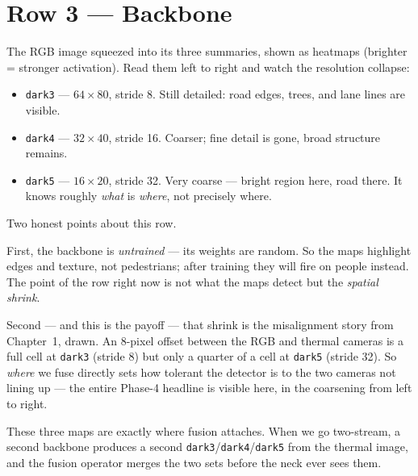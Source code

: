 \documentclass[../main.tex]{subfiles}
\begin{document}
\section{Row 3 --- Backbone}

The RGB image squeezed into its three summaries, shown as heatmaps (brighter = stronger
activation). Read them left to right and watch the resolution collapse:
\begin{itemize}
  \item \texttt{dark3} --- $64\times80$, stride 8. Still detailed: road edges, trees, and lane
        lines are visible.
  \item \texttt{dark4} --- $32\times40$, stride 16. Coarser; fine detail is gone, broad structure
        remains.
  \item \texttt{dark5} --- $16\times20$, stride 32. Very coarse --- bright region here, road there.
        It knows roughly \emph{what} is \emph{where}, not precisely where.
\end{itemize}

Two honest points about this row.

First, the backbone is \emph{untrained} --- its weights are random. So the maps highlight edges and
texture, not pedestrians; after training they will fire on people instead. The point of the row
right now is not what the maps detect but the \emph{spatial shrink}.

Second --- and this is the payoff --- that shrink is the misalignment story from Chapter~1, drawn.
An $8$-pixel offset between the RGB and thermal cameras is a full cell at \texttt{dark3}
(stride 8) but only a quarter of a cell at \texttt{dark5} (stride 32). So \emph{where} we fuse
directly sets how tolerant the detector is to the two cameras not lining up --- the entire Phase-4
headline is visible here, in the coarsening from left to right.

These three maps are exactly where fusion attaches. When we go two-stream, a second backbone
produces a second \texttt{dark3}/\texttt{dark4}/\texttt{dark5} from the thermal image, and the
fusion operator merges the two sets before the neck ever sees them.
\end{document}
